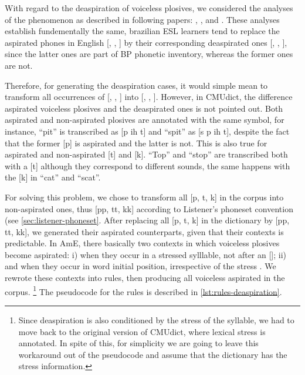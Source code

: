 With regard to the deaspiration of voiceless plosives, we considered the analyses of the phenomenon as described in following papers: 
\citeauthor{Alves2008} \citep{Alves2008}, \citeauthor{Prestes2012} \citep{Prestes2012}, 
\citeauthor{Scwartzhaupt2014} \citep{Scwartzhaupt2014} and \citeauthor{Zimmer2006} \citep{Zimmer2006}. These analyses establish 
fundementally the same, brazilian \ac{ESL} learners tend to replace the aspirated phones in English 
[, , ] by their corresponding deaspirated ones 
[, , ], since the latter ones are part of \ac{BP} phonetic inventory, whereas the former ones are not. 

Therefore, for generating the deaspiration cases, it would simple mean to transform all occurrences of
[, , ] into [, , ]. However,
in \ac{CMUdict}, the difference aspirated voiceless plosives and the deaspirated ones is not pointed out. Both aspirated and 
non-aspirated plosives are annotated with the same
symbol, for instance, ``pit'' is transcribed as [p ih t] and ``spit'' as [s p ih t], despite the fact that the former [p] is aspirated 
and the latter is not. This is also true for aspirated and non-aspirated [t] and [k]. ``Top'' and ``stop'' are transcribed both with a [t]
although they correspond to different sounds, the same happens with the [k] in ``cat'' and ``scat''.

For solving this problem, we chose to transform all [p, t, k] in the corpus into non-aspirated ones, thus [pp, tt, kk] according
to Listener's phoneset convention (see \autoref{sec:listener-phoneset}. After replacing all [p, t, k] in the dictionary by
[pp, tt, kk], we generated their aspirated counterparts, given that their contexts is predictable. In \ac{AmE}, there basically 
two contexts in which voiceless plosives become aspirated: i) when they occur in a stressed sylllable, not after an []; 
ii) and when they occur in word initial position, irrespective of the stress \citep{Lisker1985}. We rewrote these contexts 
into rules, then producing all voiceless aspirated in the corpus.
\footnote{Since deaspiration is also conditioned by the stress of the syllable, we had to move back to the original version of \ac{CMUdict}, 
where lexical stress is annotated. In spite of this, for simplicity we are going to leave this workaround out of the pseudocode 
and assume that the dictionary has the stress information.} The pseudocode for the rules is described in \autoref{lst:rules-deaspiration}.

